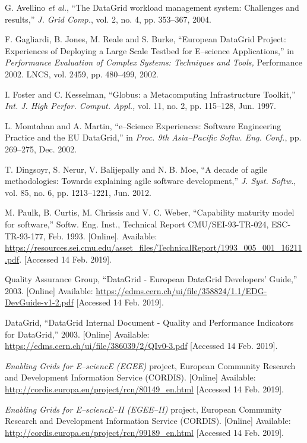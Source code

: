 \begin{thebibliography}{1}
G. Avellino \emph{et al.},
``The DataGrid workload management system: Challenges and results,''
\emph{J. Grid Comp.},
vol. 2, no. 4, pp. 353--367, 2004.


F. Gagliardi, B. Jones, M. Reale and S. Burke,
``European DataGrid Project: Experiences of Deploying a Large Scale Testbed for E--science Applications,''
in \emph{Performance Evaluation of Complex Systems: Techniques and Tools,}
Performance 2002. LNCS, vol. 2459, pp. 480--499, 2002.

I. Foster and C. Kesselman,
``Globus: a Metacomputing Infrastructure Toolkit,''
\emph{Int. J. High Perfor. Comput. Appl.,}
vol. 11, no. 2, pp. 115--128, Jun. 1997.

L. Momtahan and A. Martin,
``e--Science Experiences: Software Engineering Practice and the EU DataGrid,''
in \emph{Proc. 9th Asia--Pacific Softw. Eng. Conf.},
pp. 269--275, Dec. 2002.

T. Dingsoyr, S. Nerur, V. Balijepally and N. B. Moe,
``A decade of agile methodologies: Towards explaining agile software development,''
\emph{J. Syst. Softw.},
vol. 85, no. 6, pp. 1213--1221, Jun. 2012.

M. Paulk, B. Curtis, M. Chrissis and V. C. Weber,
``Capability maturity model for software,''
Softw. Eng. Inst.,
Technical Report CMU/SEI-93-TR-024, ESC-TR-93-177, Feb. 1993.
[Online]. Available: \url{https://resources.sei.cmu.edu/asset_files/TechnicalReport/1993_005_001_16211.pdf}.
[Accessed 14 Feb. 2019].

Quality Assurance Group, ``DataGrid - European DataGrid Developers' Guide,''
2003.
[Online] Available: \url{https://edms.cern.ch/ui/file/358824/1.1/EDG-DevGuide-v1-2.pdf}
[Accessed 14 Feb. 2019].

DataGrid, ``DataGrid Internal Document - Quality and Performance Indicators for DataGrid,''
2003.
[Online] Available: \url{https://edms.cern.ch/ui/file/386039/2/QIv0-3.pdf}
[Accessed 14 Feb. 2019].

\emph{Enabling Grids for E--sciencE (EGEE)} project, European Community Research and
Development Information Service (CORDIS).
[Online] Available: \url{http://cordis.europa.eu/project/rcn/80149_en.html}
[Accessed 14 Feb. 2019].

\emph{Enabling Grids for E--sciencE--II (EGEE--II)} project, European Community Research and
Development Information Service (CORDIS).
[Online] Available: \url{http://cordis.europa.eu/project/rcn/99189_en.html}
[Accessed 14 Feb. 2019].


\end{thebibliography}
